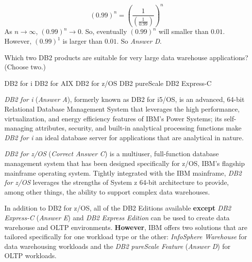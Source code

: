 \documentclass[answers, 11pt]{exam}
\begin{document}
\begin{questions}
\begin{solution}

\begin{equation*}
(0.99)^n = (\frac{1}{(\frac{1}{0.99})})^n
\end{equation*}
As $n \to \infty$, $(0.99)^n \to 0$. So, eventually $(0.99)^n$ will smaller
than $0.01$. However, $(0.99)^1$ is larger than $0.01$. So \textit{Answer D}. 
\end{solution}

\newpage
\addpoints

\question[1]
Which two DB2 products are suitable for very large data warehouse applications? (Choose two.)
\begin{choices}
\choice DB2 for i
\CorrectChoice DB2 for AIX
\CorrectChoice DB2 for z/OS
\choice DB2 pureScale
\choice DB2 Express-C
\end{choices}

\begin{solution}
\textit{DB2 for i} (\textit{Answer A}), formerly known as DB2 for i5/OS, is an
advanced, 64-bit Relational Database Management System that leverages the high
performance, virtualization, and energy efficiency features of IBM's Power Systems; 
its self-managing attributes, security, and built-in analytical processing functions
make \textit{DB2 for i} an ideal database server for {\color{red} applications that 
are analytical in nature}.
\par

\textit{DB2 for z/OS} (\textit{Correct Answer C}) is a multiuser, full-function
database management system that has been designed specifically for z/OS, 
IBM's flagship mainframe operating system. Tightly integrated with the IBM mainframe,
\textit{DB2 for z/OS} leverages the strengths of System z 64-bit architecture to
provide, among other things, the ability to support complex {\color{red} data
warehouses}. 
\par

In addition to DB2 for z/OS, all of the DB2 Editions available \textbf{except} 
\textit{DB2 Express-C} (\textit{Answer E}) and \textit{DB2 Express Edition} can be
used to create data warehouse and OLTP environments. \textbf{However},
IBM offers two solutions that are tailored specifically for one workload type or
the other: \textit{InfoSphere Warehouse} for {\color{red} data warehousing} workloads
and the \textit{DB2 pureScale Feature} (\textit{Answer D}) for {\color{red} OLTP}
workloads.

\end{solution}



\end{questions}
\end{document}
